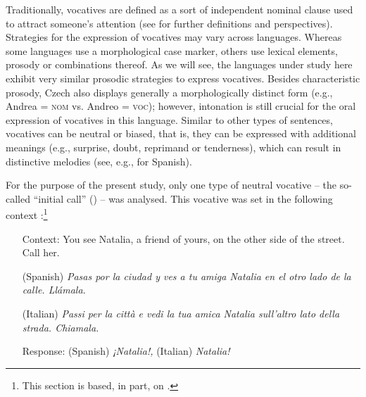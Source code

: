 Traditionally, vocatives are defined as a sort of independent nominal clause used to attract someone’s attention (see  \citealt{SonnenhauserNoelAzizHanna2013, HuttenlauchEtAl2018} for further definitions and perspectives). Strategies for the expression of vocatives may vary across languages. Whereas some languages use a morphological case marker, others use lexical elements, prosody or combinations thereof. As we will see, the languages under study here exhibit very similar prosodic strategies to express vocatives. Besides characteristic prosody, Czech also displays generally a morphologically distinct form (e.g., Andrea = \textsc{nom} vs. Andreo = \textsc{voc}); however, intonation is still crucial for the oral expression of vocatives in this language. Similar to other types of sentences, vocatives can be neutral or biased, that is, they can be expressed with additional meanings (e.g., surprise, doubt, reprimand or tenderness), which can result in distinctive melodies (see, e.g.,  \citealt{VelásquezUpegui2013, Borràs-ComesEtAl2015} for Spanish).


For the purpose of the present study, only one type of neutral vocative -- the so-called “initial call” (\citealt{FrotaPrieto2015}) -- was analysed. This vocative was set in the following context :\footnote{This section is based, in part, on \citealt{Pešková2019}.}


\begin{exe}
\ex\label{ex:4:20}
\begin{itemize}[leftmargin=2cm, labelwidth=1.6cm, align=parleft]
\item[Context:]  You see Natalia, a friend of yours, on the other side of the street. Call her.
\item[(Spanish)]  \textit{Pasas por la ciudad y ves a tu amiga Natalia en el otro lado de la calle. Llámala.}
\item[(Italian)]   \textit{Passi per la città e vedi la tua amica Natalia sull’altro lato della strada. Chiamala.}
\item[Response:]  (Spanish) \textit{¡Natalia!,} (Italian) \textit{Natalia!}
\end{itemize}
\end{exe}

